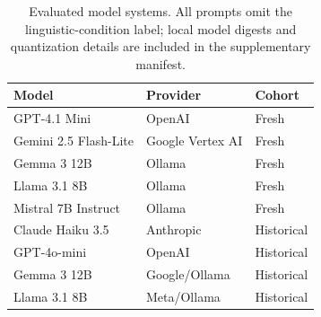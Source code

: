 \begin{table}[t]
\centering
\caption{Evaluated model systems. All prompts omit the linguistic-condition label; local model digests and quantization details are included in the supplementary manifest.}
\label{tab:model-systems}
\small
\setlength{\tabcolsep}{3pt}
\begin{tabular}{lll}
\toprule
Model & Provider & Cohort \\
\midrule
GPT-4.1 Mini & OpenAI & Fresh \\
Gemini 2.5 Flash-Lite & Google Vertex AI & Fresh \\
Gemma 3 12B & Ollama & Fresh \\
Llama 3.1 8B & Ollama & Fresh \\
Mistral 7B Instruct & Ollama & Fresh \\
Claude Haiku 3.5 & Anthropic & Historical \\
GPT-4o-mini & OpenAI & Historical \\
Gemma 3 12B & Google/Ollama & Historical \\
Llama 3.1 8B & Meta/Ollama & Historical \\
\bottomrule
\end{tabular}
\end{table}
